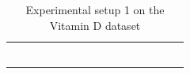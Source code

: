 \documentclass{tufte-book}
\begin{document}
\begin{table}[]
\begin{tabular}{cccccccccccccccc}
                        &                                                                                                  &                                 &                                       &                             &                                       &                                 &                                       &                             &                                       &                             &                                       &  &  &  &  \\
                        &                                                                                                  &                                 &                                       &                             &                                       &                                 &                                       &                             &                                       &                             &                                       &  &  &  &  \\
                        &                                                                                                  &                                 &                                       &                             &                                       &                                 &                                       &                             &                                       &                             &                                       &  &  &  &  \\
                        &                                                                                                  &                                 &                                       &                             &                                       &                                 &                                       &                             &                                       &                             & \textbf{}                             &  &  &  &  \\
                        &                                                                                                  &                                 &                                       &                             &                                       &                                 &                                       &                             &                                       &                             &                                       &  &  &  &  \\
                        &                                                                                                  &                                 &                                       &                             &                                       &                                 &                                       &                             &                                       &                             &                                       &  &  &  & 
\caption{Experimental setup 1 on the Vitamin D dataset}
			\end{tabular}
\end{table}
\end{document}
